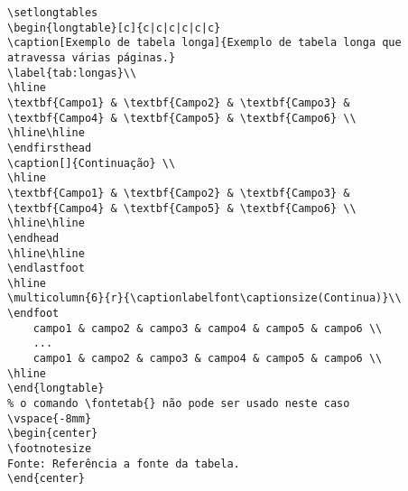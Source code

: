 \begin{verbatim}
\setlongtables
\begin{longtable}[c]{c|c|c|c|c|c}
\caption[Exemplo de tabela longa]{Exemplo de tabela longa que atravessa várias páginas.}
\label{tab:longas}\\
\hline
\textbf{Campo1} & \textbf{Campo2} & \textbf{Campo3} & 
\textbf{Campo4} & \textbf{Campo5} & \textbf{Campo6} \\
\hline\hline
\endfirsthead
\caption[]{Continuação} \\
\hline
\textbf{Campo1} & \textbf{Campo2} & \textbf{Campo3} & 
\textbf{Campo4} & \textbf{Campo5} & \textbf{Campo6} \\
\hline\hline
\endhead
\hline\hline
\endlastfoot
\hline
\multicolumn{6}{r}{\captionlabelfont\captionsize(Continua)}\\
\endfoot
	campo1 & campo2 & campo3 & campo4 & campo5 & campo6 \\
	...
	campo1 & campo2 & campo3 & campo4 & campo5 & campo6 \\
\hline
\end{longtable}
% o comando \fontetab{} não pode ser usado neste caso
\vspace{-8mm}
\begin{center}
\footnotesize
Fonte: Referência a fonte da tabela.
\end{center}
\end{verbatim}

